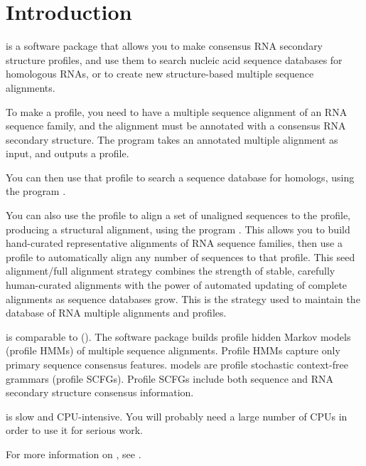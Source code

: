 \section{Introduction}

 is a software package that allows you to make
consensus RNA secondary structure profiles, and use them to search
nucleic acid sequence databases for homologous RNAs, or to create new
structure-based multiple sequence alignments.

To make a profile, you need to have a multiple sequence alignment of
an RNA sequence family, and the alignment must be annotated with a
consensus RNA secondary structure. The program  takes an
annotated multiple alignment as input, and outputs a profile.

You can then use that profile to search a sequence database for homologs,
using the program .

You can also use the profile to align a set of unaligned sequences to
the profile, producing a structural alignment, using the program
. This allows you to build hand-curated representative
alignments of RNA sequence families, then use a profile to
automatically align any number of sequences to that profile.  This
seed alignment/full alignment strategy combines the strength of
stable, carefully human-curated alignments with the power of automated
updating of complete alignments as sequence databases grow. This is
the strategy used to maintain the  database of RNA
multiple alignments and profiles.

 is comparable to 
().
The  software package builds profile hidden Markov
models (profile HMMs) of multiple sequence alignments. Profile HMMs
capture only primary sequence consensus features. 
models are profile stochastic context-free grammars (profile SCFGs).
Profile SCFGs include both sequence and RNA secondary structure
consensus information. 

 is slow and CPU-intensive. You will probably need
a large number of CPUs in order to use it for serious work. 

For more information on , see
\cite{Eddy94,Durbin98,Eddy02b,NawrockiEddy07,KolbeEddy09,Nawrocki09,Nawrocki09b}.
















